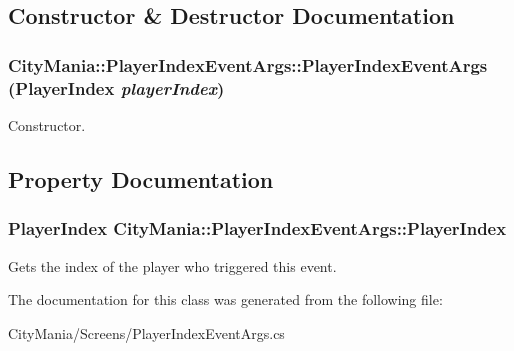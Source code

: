 \subsection{Constructor \& Destructor Documentation}
\hypertarget{classCityMania_1_1PlayerIndexEventArgs_a757c1fc60252c4cc20edae69096457db}{
\subsubsection[{PlayerIndexEventArgs}]{\setlength{\rightskip}{0pt plus 5cm}CityMania::PlayerIndexEventArgs::PlayerIndexEventArgs (PlayerIndex {\em playerIndex})}}
\label{classCityMania_1_1PlayerIndexEventArgs_a757c1fc60252c4cc20edae69096457db}


Constructor. 

\subsection{Property Documentation}
\hypertarget{classCityMania_1_1PlayerIndexEventArgs_a72cd86631ece70939ee5e6acd7a8303d}{
\subsubsection[{PlayerIndex}]{\setlength{\rightskip}{0pt plus 5cm}PlayerIndex CityMania::PlayerIndexEventArgs::PlayerIndex}}
\label{classCityMania_1_1PlayerIndexEventArgs_a72cd86631ece70939ee5e6acd7a8303d}


Gets the index of the player who triggered this event. 

The documentation for this class was generated from the following file:\begin{DoxyCompactItemize}
\item 
CityMania/Screens/PlayerIndexEventArgs.cs\end{DoxyCompactItemize}
